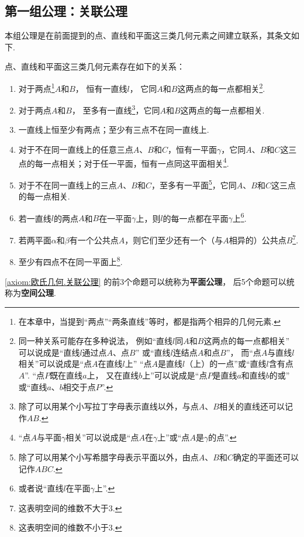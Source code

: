 \subsection{第一组公理：关联公理}
本组公理是在前面提到的点、直线和平面这三类几何元素之间建立联系，其条文如下.
\begin{axiom}[关联公理]\label{axiom:欧氏几何.关联公理}
点、直线和平面这三类几何元素存在如下的关系：
\begin{enumerate}
\item 对于两点\footnote{%
在本章中，当提到“两点”“两条直线”等时，都是指两个相异的几何元素.%
}\(A\)和\(B\)，
恒有一直线\(l\)，
它同\(A\)和\(B\)这两点的每一点都相关\footnote{%
同一种关系可能存在多种说法，
例如“直线\(l\)同\(A\)和\(B\)这两点的每一点都相关”
可以说成是“直线\(l\)通过点\(A\)、点\(B\)”
或“直线\(l\)连结点\(A\)和点\(B\)”，
而“点\(A\)与直线\(l\)相关”可以说成是“点\(A\)在直线\(l\)上”
“点\(A\)是直线\(l\)（上）的一点”或“直线\(l\)含有点\(A\)”.%
“点\(P\)既在直线\(a\)上，
又在直线\(b\)上”可以说成是“点\(P\)是直线\(a\)和直线\(b\)的或”
或“直线\(a\)、\(b\)相交于点\(P\)”.
}.

\item 对于两点\(A\)和\(B\)，
至多有一直线\footnote{%
除了可以用某个小写拉丁字母表示直线以外，与点\(A\)、\(B\)相关的直线还可以记作\(AB\).%
}，它同\(A\)和\(B\)这两点的每一点都相关.

\item 一直线上恒至少有两点；至少有三点不在同一直线上.

\item 对于不在同一直线上的任意三点\(A\)、\(B\)和\(C\)，恒有一平面\(\gamma\)，它同\(A\)、\(B\)和\(C\)这三点的每一点相关；对于任一平面，恒有一点同这平面相关\footnote{%
“点\(A\)与平面\(\gamma\)相关”可以说成是“点\(A\)在\(\gamma\)上”或“点\(A\)是\(\gamma\)的点”.%
}.

\item 对于不在同一直线上的三点\(A\)、\(B\)和\(C\)，至多有一平面\footnote{%
除了可以用某个小写希腊字母表示平面以外，由点\(A\)、\(B\)和\(C\)确定的平面还可以记作\(ABC\).%
}，它同\(A\)、\(B\)和\(C\)这三点的每一点相关.

\item 若一直线\(l\)的两点\(A\)和\(B\)在一平面\(\gamma\)上，则\(l\)的每一点都在平面\(\gamma\)上\footnote{%
或者说“直线\(l\)在平面\(\gamma\)上”.%
}.

\item 若两平面\(\alpha\)和\(\beta\)有一个公共点\(A\)，则它们至少还有一个（与\(A\)相异的）公共点\(B\)\footnote{%
这表明空间的维数不大于3.%
}.

\item 至少有四点不在同一平面上\footnote{%
这表明空间的维数不小于3.%
}.
\end{enumerate}
\end{axiom}
\cref{axiom:欧氏几何.关联公理}
的前3个命题可以统称为{\bf 平面公理}，
后5个命题可以统称为{\bf 空间公理}.


